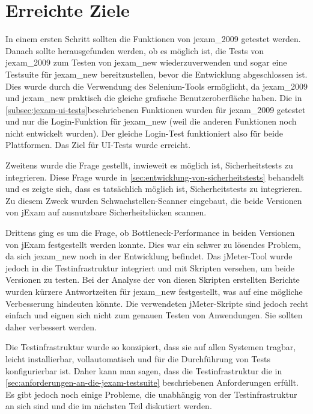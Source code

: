 \section{Erreichte Ziele}

In einem ersten Schritt sollten die Funktionen von \Gls{jexam_2009}
getestet werden. Danach sollte herausgefunden werden, ob es möglich 
ist, die Tests von \Gls{jexam_2009} zum Testen von \Gls{jexam_new} 
wiederzuverwenden und sogar eine Testsuite für \Gls{jexam_new} 
bereitzustellen, bevor die Entwicklung abgeschlossen ist. Dies wurde
durch die Verwendung des Selenium-Tools ermöglicht, da 
\Gls{jexam_2009} und \Gls{jexam_new} praktisch die gleiche grafische 
Benutzeroberfläche haben. Die in \autoref{subsec:jexam-ui-tests}beschriebenen
Funktionen wurden für \Gls{jexam_2009} getestet und nur die Login-Funktion
für \Gls{jexam_new} (weil die anderen Funktionen noch nicht entwickelt
wurden). Der gleiche Login-Test funktioniert also für beide
Plattformen. Das Ziel für UI-Tests wurde erreicht.

Zweitens wurde die Frage gestellt, inwieweit es möglich ist,
Sicherheitstests zu integrieren. Diese Frage wurde in
\autoref{sec:entwicklung-von-sicherheitstests} behandelt und es
zeigte sich, dass es tatsächlich möglich ist,
Sicherheitstests zu integrieren. Zu diesem Zweck wurden
Schwachstellen-Scanner eingebaut, die beide Versionen von jExam
auf ausnutzbare Sicherheitslücken scannen.


Drittens ging es um die Frage, ob Bottleneck-Performance in beiden
Versionen von jExam festgestellt werden konnte. Dies war ein schwer
zu lösendes Problem, da sich \Gls{jexam_new} noch in der Entwicklung
befindet. Das jMeter-Tool wurde jedoch in die Testinfrastruktur
integriert und mit Skripten versehen, um beide Versionen zu testen.
Bei der Analyse der von diesen Skripten erstellten Berichte wurden
kürzere Antwortzeiten für \Gls{jexam_new} festgestellt, was auf eine
mögliche Verbesserung hindeuten könnte. Die verwendeten jMeter-Skripte
sind jedoch recht einfach und eignen sich nicht zum genauen Testen
von Anwendungen. Sie sollten daher verbessert werden.


Die Testinfrastruktur wurde so konzipiert, dass sie auf allen
Systemen tragbar, leicht installierbar, vollautomatisch und für
die Durchführung von Tests konfigurierbar ist. Daher kann man
sagen, dass die Testinfrastruktur die in
\autoref{sec:anforderungen-an-die-jexam-testsuite} beschriebenen
Anforderungen erfüllt. Es gibt jedoch noch einige Probleme, die
unabhängig von der Testinfrastruktur an sich sind und die im
nächsten Teil diskutiert werden.





